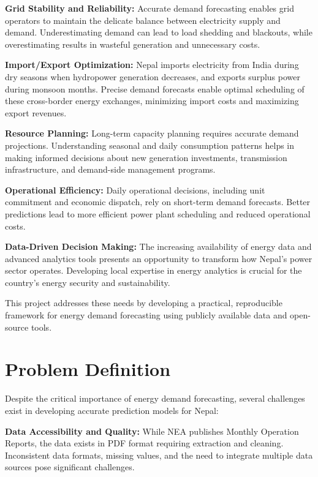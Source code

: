         \textbf{Grid Stability and Reliability:} Accurate demand forecasting enables grid operators to maintain the delicate balance between electricity supply and demand. Underestimating demand can lead to load shedding and blackouts, while overestimating results in wasteful generation and unnecessary costs.

        \textbf{Import/Export Optimization:} Nepal imports electricity from India during dry seasons when hydropower generation decreases, and exports surplus power during monsoon months. Precise demand forecasts enable optimal scheduling of these cross-border energy exchanges, minimizing import costs and maximizing export revenues.

        \textbf{Resource Planning:} Long-term capacity planning requires accurate demand projections. Understanding seasonal and daily consumption patterns helps in making informed decisions about new generation investments, transmission infrastructure, and demand-side management programs.

        \textbf{Operational Efficiency:} Daily operational decisions, including unit commitment and economic dispatch, rely on short-term demand forecasts. Better predictions lead to more efficient power plant scheduling and reduced operational costs.

        \textbf{Data-Driven Decision Making:} The increasing availability of energy data and advanced analytics tools presents an opportunity to transform how Nepal's power sector operates. Developing local expertise in energy analytics is crucial for the country's energy security and sustainability.

        This project addresses these needs by developing a practical, reproducible framework for energy demand forecasting using publicly available data and open-source tools.

    \section{Problem Definition}
        Despite the critical importance of energy demand forecasting, several challenges exist in developing accurate prediction models for Nepal:

        \textbf{Data Accessibility and Quality:} While NEA publishes Monthly Operation Reports, the data exists in PDF format requiring extraction and cleaning. Inconsistent data formats, missing values, and the need to integrate multiple data sources pose significant challenges.

